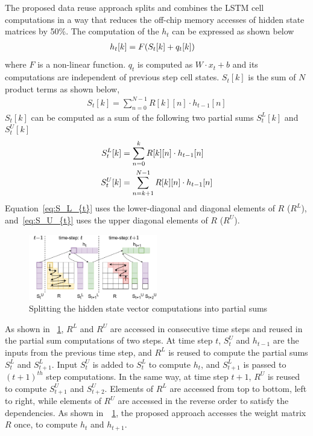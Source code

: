 \documentclass[a4paper,10pt]{article}
\begin{document}
The proposed data reuse approach splits and combines the LSTM cell computations in a way that reduces the off-chip memory accesses of hidden state matrices by 50\%. The computation of the $h_t$ can be expressed as shown below
\begin{align}\label{eq:h_{t}}
	h_{t}[k] &= F( S_{t}[k]+q_{t}[k])
\end{align}
where $F$ is a non-linear function. $q_{t}$ is computed as $W{\cdot}x_t{+}b$ and its computations are independent of previous step cell states. $S_{t}[k]$ is the sum of $N$ product terms as shown below,
\begin{align}
	S_{t}[k] = \sum_{n=0}^{N-1}R[k][n]\cdot h_{t-1}[n]
\end{align}
$S_{t}[k]$ can be computed as a sum of the following two partial sums $S_{t}^{L}[k]$ and $S_{t}^{U}[k]$
\begin{align}      
	S_{t}^{L}[k] &= \sum_{n=0}^{k}R[k][n]\cdot h_{t-1}[n] \label{eq:S_L_{t}}\\
	S_{t}^{U}[k] &= \sum_{n=k+1}^{N-1}R[k][n]\cdot h_{t-1}[n] \label{eq:S_U_{t}}
\end{align}
Equation~\eqref{eq:S_L_{t}} uses the lower-diagonal and diagonal elements of $R$ ($R^L$), and~\eqref{eq:S_U_{t}} uses the upper diagonal elements of $R$ ($R^U$). 
\begin{figure}[!tb]
	\centerline{\includegraphics[width=0.5\textwidth]{TwoTimeSteps.pdf}}
	\caption{Splitting the hidden state vector computations into partial sums}
	\label{fig:TwoTimeStepsComputation}
	\vspace{-1.0em}	
\end{figure}
As shown in \figurename{~\ref{fig:TwoTimeStepsComputation}}, $R^L$ and $R^U$ are accessed in consecutive time steps and reused in the partial sum computations of two steps. At time step $t$, $S_t^U$ and $h_{t-1}$ are the inputs from the previous time step, and $R^L$ is reused to compute the partial sums $S_{t}^{L}$ and $S_{t+1}^L$. Input $S_{t}^{U}$ is added to $S_{t}^{L}$ to compute $h_{t}$, and $S_{t+1}^L$ is passed to $(t{+}1)^{th}$ step computations.
In the same way, at time step $t{+}1$, $R^U$ is reused to compute $S_{t+1}^{U}$ and $S_{t+2}^{U}$. Elements of $R^L$ are accessed from top to bottom, left to right, while elements of $R^U$ are accessed in the reverse order to satisfy the dependencies. As shown in~\figurename{~\ref{fig:TwoTimeStepsComputation}}, the proposed approach accesses the weight matrix $R$ once, to compute $h_{t}$ and $h_{t+1}$. 

\end{document}
